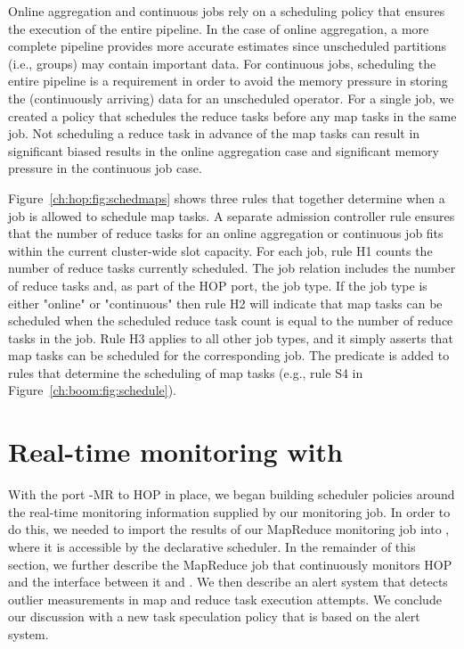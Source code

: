 Online aggregation and continuous jobs rely on a scheduling policy that ensures
the execution of the entire pipeline.  In the case of online aggregation, a
more complete pipeline provides more accurate estimates since unscheduled
partitions (i.e., groups) may contain important data.  For continuous jobs,
scheduling the entire pipeline is a requirement in order to avoid the memory
pressure in storing the (continuously arriving) data for an unscheduled
operator.  For a single job, we created a policy that schedules the reduce
tasks before any map tasks in the same job.  Not scheduling a reduce task in
advance of the map tasks can result in significant biased results in the online
aggregation case and significant memory pressure in the continuous job case.

Figure~\ref{ch:hop:fig:schedmaps} shows three rules that together determine
when a job is allowed to schedule map tasks.  A separate admission controller
rule ensures that the number of reduce tasks for an online aggregation or
continuous job fits within the current cluster-wide slot capacity.  For each
job, rule H1 counts the number of reduce tasks currently scheduled.  The job
relation includes the number of reduce tasks and, as part of the HOP port, the
job type.  If the job type is either "online" or "continuous" then rule H2 will
indicate that map tasks can be scheduled when the scheduled reduce task count
is equal to the number of reduce tasks in the job.  Rule H3 applies to all
other job types, and it simply asserts that map tasks can be scheduled for the
corresponding job.  The  predicate is added to rules that
determine the scheduling of map tasks (e.g., rule S4 in
Figure~\ref{ch:boom:fig:schedule}).

\section{Real-time monitoring with \JOL}
\label{ch:hop:sec:jolmonitor}

With the port \BOOM-MR to HOP in place, we began building scheduler policies around the real-time monitoring information supplied by our
monitoring job. In order to do this, we needed to import the results of our MapReduce monitoring job into \JOL, where
it is accessible by the declarative scheduler. In the remainder of this section, we further describe the MapReduce job that
continuously monitors HOP and the interface between it and \JOL. We then describe an alert system that detects outlier measurements in map and 
reduce task execution attempts. We conclude our discussion with a new task speculation policy that is based on the alert system.

